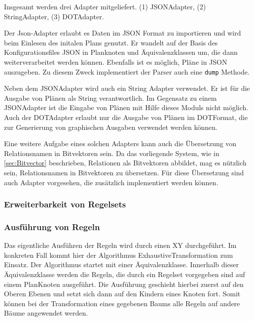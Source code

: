 Insgesamt werden drei Adapter mitgeliefert. (1) JSON\-Adapter, (2) String\-Adapter, (3) DOT\-Adapter.

Der Json-Adapter erlaubt es Daten im JSON Format zu importieren und wird beim Einlesen des initalen Plans genutzt. Er wandelt auf der Basis des Konfigurationsfiles JSON in Planknoten und Äquivalenzklassen um, die dann weiterverarbeitet werden können. Ebenfalls ist es möglich, Pläne in JSON auszugeben. Zu diesem Zweck implementiert der Parser auch eine \texttt{dump} Methode.

Neben dem JSON\-Adapter wird auch ein String Adapter verwendet. Er ist für die Ausgabe von Plänen als String verantwortlich. Im Gegensatz zu einem JSON\-Adapter ist die Eingabe von Plänen mit Hilfe dieses Moduls nicht möglich. Auch der DOT\-Adapter erlaubt nur die Ausgabe von Plänen im DOT\-Format, die  zur Generierung von graphischen Ausgaben verwendet werden können.

Eine weitere Aufgabe eines solchen Adapters kann auch die Übersetzung von Relationsnamen in Bitvektoren sein. Da das vorliegende System, wie in \ref{sec:Bitvector} beschrieben, Relationen als Bitvektoren abbildet, mag es nützlich sein, Relationsnamen in Bitvektoren zu übersetzen. Für diese Übersetzung sind auch Adapter vorgesehen, die zusätzlich implementiert werden können.












\subsubsection{Erweiterbarkeit von Regelsets}





\subsubsection{Ausführung von Regeln}

Das eigentliche Ausführen der Regeln wird durch einen XY durchgeführt. Im konkreten Fall kommt hier der Algorithmus ExhaustiveTransformation zum Einsatz. Der Algorithmus startet mit einer Äquivalenzklasse. Innerhalb dieser Äquivalenzklasse werden die Regeln, die durch ein Regelset vorgegeben sind auf einem PlanKnoten ausgeführt. Die Ausführung geschieht hierbei zuerst auf den Oberen Ebenen und setzt sich dann auf den Kindern eines Knoten fort. Somit können bei der Transformation eines gegebenen Baums alle Regeln auf andere Bäume angewendet werden.

